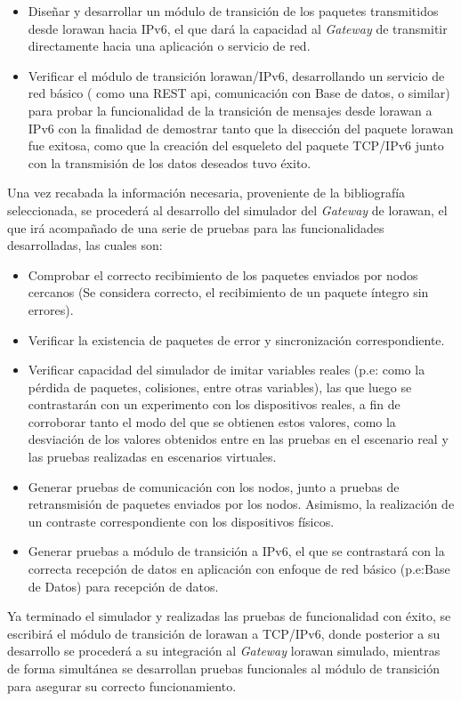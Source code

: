 \begin{justify}
\begin{itemize}
\item Diseñar y desarrollar un módulo de transición de los paquetes transmitidos desde \gls{lorawan} hacia IPv6, el que dará la capacidad al \textit{Gateway} de transmitir directamente hacia una aplicación o servicio de red.
\item Verificar el módulo de transición \gls{lorawan}/IPv6, desarrollando un servicio de red básico ( como una REST \gls{api}, comunicación con Base de datos, o similar) para probar la funcionalidad de la transición de mensajes desde \gls{lorawan} a IPv6 con la finalidad de demostrar tanto que la disección del paquete \gls{lorawan} fue exitosa, como que la creación del esqueleto del paquete TCP/IPv6 junto con la transmisión de los datos deseados tuvo éxito.
\end{itemize}

Una vez recabada la información necesaria, proveniente de la bibliografía seleccionada, se procederá al desarrollo del simulador del \textit{Gateway} de \gls{lorawan}, el que irá acompañado de una serie de pruebas para las funcionalidades desarrolladas, las cuales son:\\
\begin{itemize}
\item Comprobar el correcto recibimiento de los paquetes enviados por nodos cercanos (Se considera correcto, el recibimiento de un paquete íntegro sin errores).
\item Verificar la existencia de paquetes de error y sincronización correspondiente.
\item Verificar capacidad del simulador de imitar variables reales (p.e: como la pérdida de paquetes, colisiones, entre otras variables), las que luego se contrastarán con un experimento con los dispositivos reales, a fin de corroborar tanto el modo del que se obtienen estos valores, como la desviación de los valores obtenidos entre en las pruebas en el escenario real y las pruebas realizadas en escenarios virtuales.
\item Generar pruebas de comunicación con los nodos, junto a pruebas de retransmisión de paquetes enviados por los nodos. Asimismo, la realización de un contraste correspondiente con los dispositivos físicos.
\item Generar pruebas a módulo de transición a IPv6, el que se contrastará con la correcta recepción de datos en aplicación con enfoque de red básico (p.e:Base de Datos) para recepción de datos.
\end{itemize}
Ya terminado el simulador y realizadas las pruebas de funcionalidad con éxito, se escribirá el módulo de transición de \gls{lorawan} a TCP/IPv6, donde posterior a su desarrollo se procederá a su integración al \textit{Gateway} \gls{lorawan} simulado, mientras de forma simultánea se desarrollan pruebas funcionales al módulo de transición para asegurar su correcto funcionamiento.
\end{justify}